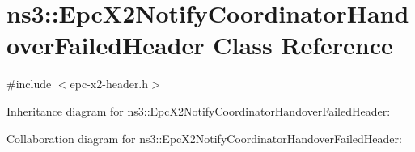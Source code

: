 \hypertarget{classns3_1_1EpcX2NotifyCoordinatorHandoverFailedHeader}{}\section{ns3\+:\+:Epc\+X2\+Notify\+Coordinator\+Handover\+Failed\+Header Class Reference}
\label{classns3_1_1EpcX2NotifyCoordinatorHandoverFailedHeader}


{\ttfamily \#include $<$epc-\/x2-\/header.\+h$>$}



Inheritance diagram for ns3\+:\+:Epc\+X2\+Notify\+Coordinator\+Handover\+Failed\+Header\+:


Collaboration diagram for ns3\+:\+:Epc\+X2\+Notify\+Coordinator\+Handover\+Failed\+Header\+:
